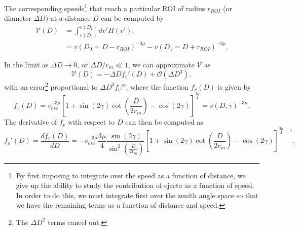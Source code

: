\documentclass{hitec}
\numberwithin{equation}{section}
\begin{document}
The corresponding speeds\footnote{By first imposing to integrate over the speed as a function of distance, we give up the ability to study the contribution of ejecta as a function of speed. In order to do this, we must integrate first over the zenith angle space so that we have the remaining terms as a function of distance and speed.} that reach a particular ROI of radius $r_{ROI}$ (or diameter $\Delta D$) at a distance $D$ can be computed by
\begin{align}
\mathcal{V}(D) &= \int_{v(D_0)}^{v(D_1)}dv'H(v'),\\
&= v(D_0 = D - r_{ROI})^{-3\mu} - v(D_1 = D + r_{ROI})^{-3\mu}.
\end{align}

In the limit as $\Delta D \to 0$, or $\Delta D/r_m \ll 1$, we can approximate $\mathcal{V}$ as
\begin{equation}
\mathcal{V}(D) = -\Delta D f_v'(D) + \mathcal{O}(\Delta D^3),
\end{equation}
with an error\footnote{The $\Delta D^2$ terms cancel out.} proportional to $\Delta D^3f_v'''$, where the function $f_v(D)$ is given by
\begin{equation}
f_v(D) = v_{esc}^{-3\mu}\left[1+\sin(2\gamma)\cot\left(\frac{D}{2r_m}\right) - \cos(2\gamma)\right]^{\frac{3\mu}{2}} = v(D,\gamma)^{-3\mu}.
\end{equation}
The derivative of $f_v$ with respect to $D$ can then be computed as
\begin{equation}\label{eq:fv'}
f_v'(D) = \frac{df_v(D)}{dD} = -v_{esc}^{-3\mu}\frac{3\mu}{4}\frac{\sin(2\gamma)}{\sin^2\left(\frac{D}{2r_m}\right)}\left[1+\sin(2\gamma)\cot\left(\frac{D}{2r_m}\right) - \cos(2\gamma)\right]^{\frac{3\mu}{2}-1}.
\end{equation}
\end{document}
